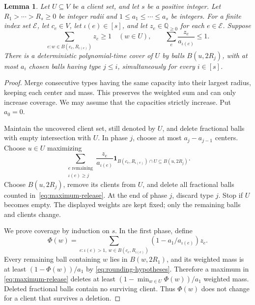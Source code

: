 \documentclass[11pt]{article}
\numberwithin{equation}{section}
\newtheorem{lemma}[theorem]{Lemma}
\theoremstyle{definition}
\newcommand{\Q}{\mathbb Q}
\newcommand{\ind}{\mathbf 1}
\begin{document}
\begin{lemma}\label{lem:cumulative-rounding}
Let $U\subseteq V$ be a client set, and let $s$ be a positive integer.
Let $R_1>\cdots>R_s\ge0$ be
integer radii and $1\le a_1\le\cdots\le a_s$ be integers.
For a finite index set $\mathcal E$, let $c_e\in V$, let
$\iota(e)\in[s]$, and let $z_e\in\Q_{\ge0}$ for each $e\in\mathcal E$.
Suppose
\begin{equation}\label{eq:rounding-hypotheses}
 \sum_{e:w\in B(c_e,R_{\iota(e)})}z_e\ge1\quad(w\in U),
 \qquad
 \sum_e\frac{z_e}{a_{\iota(e)}}\le1.
\end{equation}
There is a deterministic polynomial-time cover of $U$ by balls
$B(u,2R_j)$, with at most $a_i$ chosen balls having type $j\le i$,
simultaneously for every $i\in[s]$.
\end{lemma}
\begin{proof}
Merge consecutive types having the same capacity into their largest
radius, keeping each center and mass. This preserves the weighted sum
and can only increase coverage. We may assume that the capacities
strictly increase. Put $a_0=0$.

Maintain the uncovered client set, still denoted by $U$, and delete
fractional balls with empty intersection with $U$. In phase $j$, choose
at most $a_j-a_{j-1}$ centers. Choose $u\in U$ maximizing
\begin{equation}\label{eq:maximum-release}
 \sum_{\substack{e\text{ remaining}\\\iota(e)\ge j}}
 \frac{z_e}{a_{\iota(e)}}
 \ind_{B(c_e,R_{\iota(e)})\cap U\subseteq B(u,2R_j)}.
\end{equation}
Choose $B(u,2R_j)$, remove its clients from $U$, and delete all fractional
balls counted in~\eqref{eq:maximum-release}. At the end of phase $j$,
discard type $j$. Stop if $U$ becomes empty. The displayed weights are
kept fixed; only the remaining balls and clients change.

We prove coverage by induction on $s$. In the first phase, define
\[
 \Phi(w)=\sum_{e:\iota(e)>1,\ w\in B(c_e,R_{\iota(e)})}
             (1-a_1/a_{\iota(e)})z_e.
\]
Every remaining ball containing $w$ lies in $B(w,2R_1)$, and its
weighted mass is at least $(1-\Phi(w))/a_1$ by
\eqref{eq:rounding-hypotheses}. Therefore a maximum in
\eqref{eq:maximum-release} deletes at least
$(1-\min_{w\in U}\Phi(w))/a_1$ weighted mass.
Deleted fractional balls contain no surviving client. Thus $\Phi(w)$
does not change for a client that survives a deletion.


\end{proof}
\end{document}
